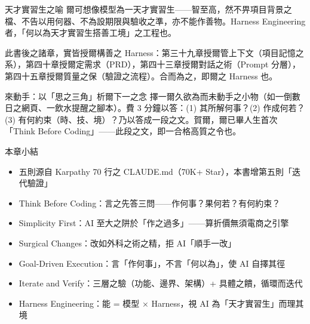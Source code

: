 \begin{tcbinfo}{天才實習生之喻}
爾可想像模型為一天才實習生——智至高，然不畀項目背景之檔、不告以用何器、不為設期限與驗收之準，亦不能作善物。Harness Engineering 者，「何以為天才實習生搭善工境」之工程也。

\end{tcbinfo}

此書後之諸章，實皆授爾構善之 Harness：第三十九章授爾管上下文（項目記憶之系），第四十章授爾定需求（PRD），第四十三章授爾對話之術（Prompt 分層），第四十五章授爾質量之保（驗證之流程）。合而為之，即爾之 Harness 也。

\begin{tcbpractice}{來動手：以「思之三角」析爾下一之念}
擇一爾久欲為而未動手之小物（如一倒數日之網頁、一飲水提醒之腳本）。費 3 分鐘以答：(1) 其所解何事？(2) 作成何若？(3) 有何約束（時、技、境）？乃以答成一段之文。賀爾，爾已畢人生首次「Think Before Coding」——此段之文，即一合格高質之令也。

\end{tcbpractice}

\begin{tcbsummary}{本章小結}
\begin{itemize}
  \item 五則源自 Karpathy 70 行之 CLAUDE.md（70K+ Star），本書增第五則「迭代驗證」
  \item Think Before Coding：言之先答三問——作何事？果何若？有何約束？
  \item Simplicity First：AI 至大之阱於「作之過多」——算折價無須電商之引擎
  \item Surgical Changes：改如外科之術之精，拒 AI「順手一改」
  \item Goal-Driven Execution：言「作何事」，不言「何以為」，使 AI 自擇其徑
  \item Iterate and Verify：三層之驗（功能、邊界、架構）+ 具體之饋，循環而迭代
  \item Harness Engineering：能 = 模型 × Harness，視 AI 為「天才實習生」而理其境
\end{itemize}

\end{tcbsummary}
